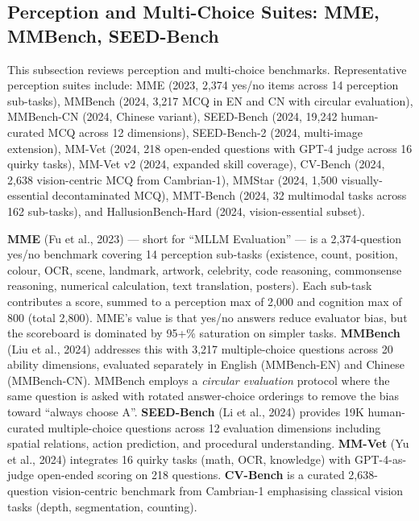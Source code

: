 \subsection{Perception and Multi-Choice Suites: MME, MMBench, SEED-Bench}\label{perception-and-multi-choice-suites-mme-mmbench-seed-bench}

This subsection reviews perception and multi-choice benchmarks. Representative perception suites include: MME (2023, 2,374 yes/no items across 14 perception sub-tasks), MMBench (2024, 3,217 MCQ in EN and CN with circular evaluation), MMBench-CN (2024, Chinese variant), SEED-Bench (2024, 19,242 human-curated MCQ across 12 dimensions), SEED-Bench-2 (2024, multi-image extension), MM-Vet (2024, 218 open-ended questions with GPT-4 judge across 16 quirky tasks), MM-Vet v2 (2024, expanded skill coverage), CV-Bench (2024, 2,638 vision-centric MCQ from Cambrian-1), MMStar (2024, 1,500 visually-essential decontaminated MCQ), MMT-Bench (2024, 32 multimodal tasks across 162 sub-tasks), and HallusionBench-Hard (2024, vision-essential subset).

\textbf{MME} (Fu et al., 2023) --- short for ``MLLM Evaluation'' --- is a 2,374-question yes/no benchmark covering 14 perception sub-tasks (existence, count, position, colour, OCR, scene, landmark, artwork, celebrity, code reasoning, commonsense reasoning, numerical calculation, text translation, posters). Each sub-task contributes a score, summed to a perception max of 2,000 and cognition max of 800 (total 2,800). MME's value is that yes/no answers reduce evaluator bias, but the scoreboard is dominated by 95+\% saturation on simpler tasks. \textbf{MMBench} (Liu et al., 2024) addresses this with 3,217 multiple-choice questions across 20 ability dimensions, evaluated separately in English (MMBench-EN) and Chinese (MMBench-CN). MMBench employs a \emph{circular evaluation} protocol where the same question is asked with rotated answer-choice orderings to remove the bias toward ``always choose A''. \textbf{SEED-Bench} (Li et al., 2024) provides 19K human-curated multiple-choice questions across 12 evaluation dimensions including spatial relations, action prediction, and procedural understanding. \textbf{MM-Vet} (Yu et al., 2024) integrates 16 quirky tasks (math, OCR, knowledge) with GPT-4-as-judge open-ended scoring on 218 questions. \textbf{CV-Bench} is a curated 2,638-question vision-centric benchmark from Cambrian-1 emphasising classical vision tasks (depth, segmentation, counting).

